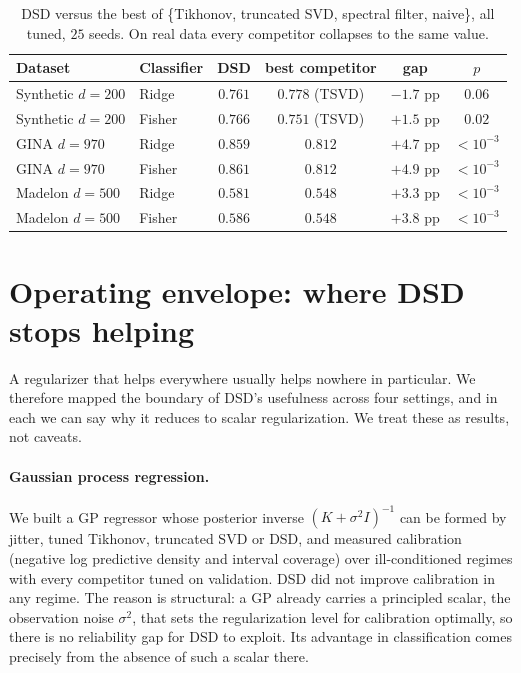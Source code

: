 \documentclass[preprint,12pt]{elsarticle}
\begin{document}
\begin{table}[t]
\centering
\caption{DSD versus the best of \{Tikhonov, truncated SVD, spectral filter, naive\}, all tuned,
$25$ seeds. On real data every competitor collapses to the same value.}
\label{tab:strong}
\begin{tabular}{llcccc}
\toprule
Dataset & Classifier & DSD & best competitor & gap & $p$ \\
\midrule
Synthetic $d{=}200$ & Ridge  & $0.761$ & $0.778$ (TSVD) & $-1.7$ pp & $0.06$ \\
Synthetic $d{=}200$ & Fisher & $0.766$ & $0.751$ (TSVD) & $+1.5$ pp & $0.02$ \\
GINA $d{=}970$      & Ridge  & $0.859$ & $0.812$ & $+4.7$ pp & ${<}10^{-3}$ \\
GINA $d{=}970$      & Fisher & $0.861$ & $0.812$ & $+4.9$ pp & ${<}10^{-3}$ \\
Madelon $d{=}500$   & Ridge  & $0.581$ & $0.548$ & $+3.3$ pp & ${<}10^{-3}$ \\
Madelon $d{=}500$   & Fisher & $0.586$ & $0.548$ & $+3.8$ pp & ${<}10^{-3}$ \\
\bottomrule
\end{tabular}
\end{table}

\section{Operating envelope: where DSD stops helping}
\label{sec:envelope}

A regularizer that helps everywhere usually helps nowhere in particular. We therefore mapped the
boundary of DSD's usefulness across four settings, and in each we can say why it reduces to scalar
regularization. We treat these as results, not caveats.

\paragraph{Gaussian process regression.} We built a GP regressor whose posterior inverse
$(K+\sigma^2 I)^{-1}$ can be formed by jitter, tuned Tikhonov, truncated SVD or DSD, and measured
calibration (negative log predictive density and interval coverage) over ill-conditioned regimes with
every competitor tuned on validation. DSD did not improve calibration in any regime. The reason is
structural: a GP already carries a principled scalar, the observation noise $\sigma^2$, that sets the
regularization level for calibration optimally, so there is no reliability gap for DSD to exploit. Its
advantage in classification comes precisely from the absence of such a scalar there.
\end{document}
